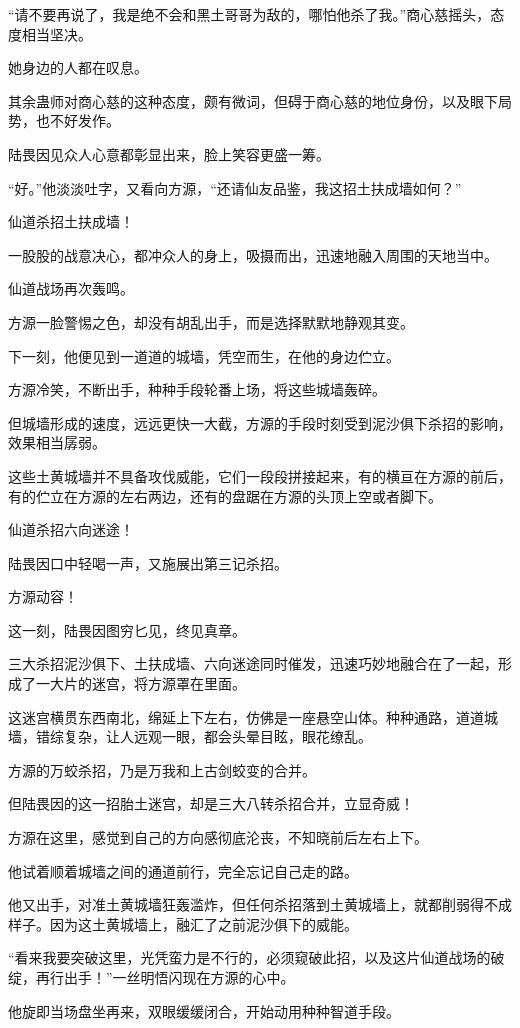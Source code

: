 \begin{this_body}
“请不要再说了，我是绝不会和黑土哥哥为敌的，哪怕他杀了我。”商心慈摇头，态度相当坚决。

她身边的人都在叹息。

其余蛊师对商心慈的这种态度，颇有微词，但碍于商心慈的地位身份，以及眼下局势，也不好发作。

陆畏因见众人心意都彰显出来，脸上笑容更盛一筹。

“好。”他淡淡吐字，又看向方源，“还请仙友品鉴，我这招土扶成墙如何？”

仙道杀招土扶成墙！

一股股的战意决心，都冲众人的身上，吸摄而出，迅速地融入周围的天地当中。

仙道战场再次轰鸣。

方源一脸警惕之色，却没有胡乱出手，而是选择默默地静观其变。

下一刻，他便见到一道道的城墙，凭空而生，在他的身边伫立。

方源冷笑，不断出手，种种手段轮番上场，将这些城墙轰碎。

但城墙形成的速度，远远更快一大截，方源的手段时刻受到泥沙俱下杀招的影响，效果相当孱弱。

这些土黄城墙并不具备攻伐威能，它们一段段拼接起来，有的横亘在方源的前后，有的伫立在方源的左右两边，还有的盘踞在方源的头顶上空或者脚下。

仙道杀招六向迷途！

陆畏因口中轻喝一声，又施展出第三记杀招。

方源动容！

这一刻，陆畏因图穷匕见，终见真章。

三大杀招泥沙俱下、土扶成墙、六向迷途同时催发，迅速巧妙地融合在了一起，形成了一大片的迷宫，将方源罩在里面。

这迷宫横贯东西南北，绵延上下左右，仿佛是一座悬空山体。种种通路，道道城墙，错综复杂，让人远观一眼，都会头晕目眩，眼花缭乱。

方源的万蛟杀招，乃是万我和上古剑蛟变的合并。

但陆畏因的这一招胎土迷宫，却是三大八转杀招合并，立显奇威！

方源在这里，感觉到自己的方向感彻底沦丧，不知晓前后左右上下。

他试着顺着城墙之间的通道前行，完全忘记自己走的路。

他又出手，对准土黄城墙狂轰滥炸，但任何杀招落到土黄城墙上，就都削弱得不成样子。因为这土黄城墙上，融汇了之前泥沙俱下的威能。

“看来我要突破这里，光凭蛮力是不行的，必须窥破此招，以及这片仙道战场的破绽，再行出手！”一丝明悟闪现在方源的心中。

他旋即当场盘坐再来，双眼缓缓闭合，开始动用种种智道手段。

\end{this_body}

